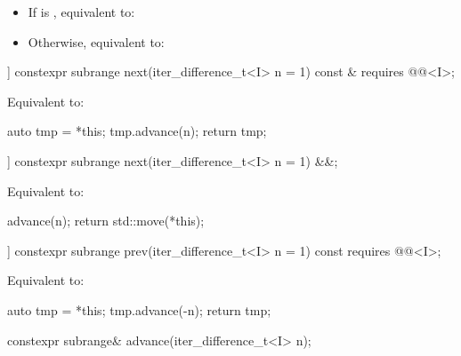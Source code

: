 \begin{itemdescr}
\pnum
\effects
\begin{itemize}
\item If  is , equivalent to: 
\item Otherwise, equivalent to: 
\end{itemize}
\end{itemdescr}

%
\begin{itemdecl}
[[nodiscard]] constexpr subrange next(iter_difference_t<I> n = 1) const &
  requires @@<I>;
\end{itemdecl}

\begin{itemdescr}
\pnum
\effects
Equivalent to:
\begin{codeblock}
auto tmp = *this;
tmp.advance(n);
return tmp;
\end{codeblock}
\end{itemdescr}

%
\begin{itemdecl}
[[nodiscard]] constexpr subrange next(iter_difference_t<I> n = 1) &&;
\end{itemdecl}

\begin{itemdescr}
\pnum
\effects
Equivalent to:
\begin{codeblock}
advance(n);
return std::move(*this);
\end{codeblock}
\end{itemdescr}

%
\begin{itemdecl}
[[nodiscard]] constexpr subrange prev(iter_difference_t<I> n = 1) const
  requires @@<I>;
\end{itemdecl}

\begin{itemdescr}
\pnum
\effects
Equivalent to:
\begin{codeblock}
auto tmp = *this;
tmp.advance(-n);
return tmp;
\end{codeblock}
\end{itemdescr}

%
\begin{itemdecl}
constexpr subrange& advance(iter_difference_t<I> n);
\end{itemdecl}

